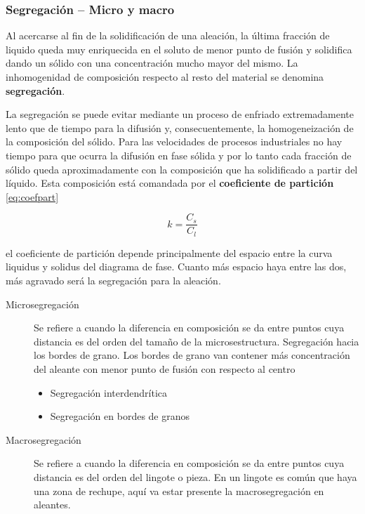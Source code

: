 \subsubsection{Segregación -- Micro y macro}

Al acercarse al fin de la solidificación de una aleación, la última fracción de liquido queda muy enriquecida en el soluto de menor punto de fusión y solidifica dando un sólido con una concentración mucho mayor del mismo. La inhomogenidad de composición respecto al resto del material se denomina \textbf{segregación}.

La segregación se puede evitar mediante un proceso de enfriado extremadamente lento que de tiempo para la difusión y, consecuentemente, la homogeneización de la composición del sólido. Para las velocidades de procesos industriales no hay tiempo para que ocurra la difusión en fase sólida y por lo tanto cada fracción de sólido queda aproximadamente con la composición que ha solidificado a partir del líquido. Esta composición está comandada por el \textbf{coeficiente de partición} \eqref{eq:coefpart}

\begin{equation} \label{eq:coefpart}
	k = \frac{C_s}{C_l}
\end{equation}

el coeficiente de partición depende principalmente del espacio entre la curva liquidus y solidus del diagrama de fase. Cuanto más espacio haya entre las dos, más agravado será la segregación para la aleación.



\begin{description}
	\item[Microsegregación] Se refiere a cuando la diferencia en composición se da entre puntos cuya distancia es del orden del tamaño de la microsestructura. Segregación hacia los bordes de grano. Los bordes de grano van contener más concentración del aleante con menor punto de fusión con respecto al centro
	      \begin{itemize}
		      \item Segregación interdendrítica
		      \item Segregación en bordes de granos
	      \end{itemize}
	\item[Macrosegregación] Se refiere a cuando la diferencia en composición se da entre puntos cuya distancia es del orden del lingote o pieza. En un lingote es común que haya una zona de rechupe, aquí va estar presente la macrosegregación en aleantes.
\end{description}

